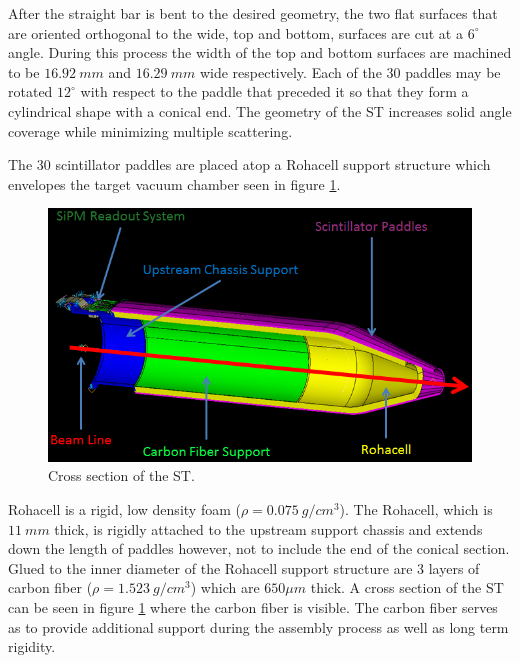 After the straight bar is bent to the desired geometry, the two flat surfaces that are oriented orthogonal to the wide, top and bottom, surfaces are cut at a $6^{\circ}$ angle.  During this process the width of the top and bottom surfaces are machined to be $16.92\ mm$ and $16.29\ mm$ wide respectively.  Each of the 30 paddles may be rotated $12^{\circ}$ with respect to the paddle that preceded it so that they form a cylindrical shape with a conical end.  The geometry of the ST increases solid angle coverage while minimizing multiple scattering.  

The 30 scintillator paddles are placed atop a Rohacell support structure which envelopes the target vacuum chamber seen in figure \ref{fig:ST_Cross_Section}.  
\begin{figure}[!htb]
	\centering
	\includegraphics[width=1.0\columnwidth]{design/figs/ST_Cross_Section}
	\caption[Cross section of the ST]{Cross section of the ST.}
	\label{fig:ST_Cross_Section}
\end{figure}
Rohacell is a rigid, low density foam ($\rho = 0.075\ g/cm^{3}$).  The Rohacell, which is $11\ mm$ thick, is rigidly attached to the upstream support chassis and extends down the length of paddles however, not to include the end of the conical section.  Glued to the inner diameter of the Rohacell support structure are 3 layers of carbon fiber ($\rho = 1.523\ g/cm^{3}$) which are $650 \mu m$ thick.  A cross section of the ST can be seen in figure \ref{fig:ST_Cross_Section} where the carbon fiber is visible.  The carbon fiber serves as to provide additional support during the assembly process as well as long term rigidity.  

